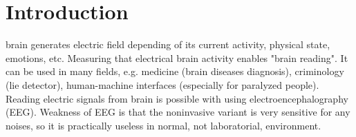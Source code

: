 \documentclass[10pt,journal,compsoc]{IEEEtran}
\begin{document}
\ifCLASSOPTIONcompsoc
{}
\else
\section{Introduction}
\label{sec:introduction}
\fi




% 
% 
% 
% 
 brain generates electric field depending of its current activity, physical state, emotions, etc. Measuring that electrical brain activity enables "brain reading". It can be used in many fields, e.g. medicine (brain diseases diagnosis), criminology (lie detector), human-machine interfaces (especially for paralyzed people). Reading electric signals from brain is possible with using electroencephalography (EEG). Weakness of EEG is that the noninvasive variant is very sensitive for any noises, so it is practically useless in normal, not laboratorial, environment.
\end{document}
